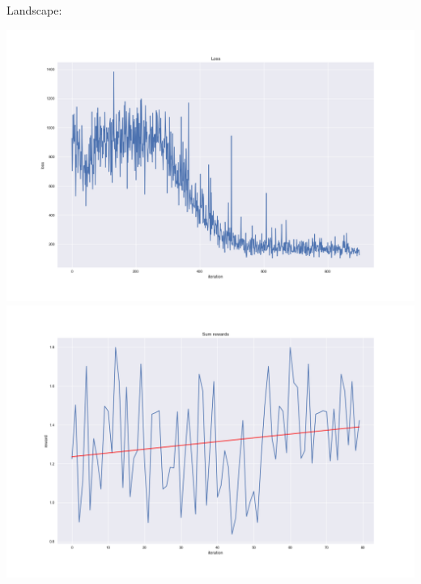 \documentclass{article}
\begin{document}
Landscape:

\includegraphics[scale=0.2]{plots/landscape_loss.png}
\includegraphics[scale=0.2]{plots/landscape_rewards.png}



\end{document}
